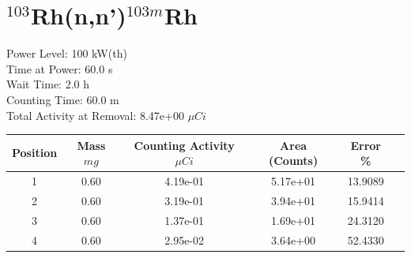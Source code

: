\newpage

\section*{ $^{103}$Rh(n,n')$^{103m}$Rh }

Power Level: 100 kW(th) \\
Time at Power: 60.0 s \\
Wait Time:  2.0 h \\
Counting Time: 60.0 m \\
Total Activity at Removal: 8.47e+00 $\mu Ci$

\begin{table}[h]
\centering
\begin{tabular}{ |c|c|c|c|c|c| }
 \hline
 Position & Mass $mg$ & Counting Activity $\mu Ci$ & Area (Counts) & Error \% \\
 \hline 
 1 & 0.60 & 4.19e-01 & 5.17e+01 & 13.9089 \\ 
\hline
 2 & 0.60 & 3.19e-01 & 3.94e+01 & 15.9414 \\ 
\hline
 3 & 0.60 & 1.37e-01 & 1.69e+01 & 24.3120 \\ 
\hline
 4 & 0.60 & 2.95e-02 & 3.64e+00 & 52.4330 \\ 
\hline
\end{tabular}
\end{table}

